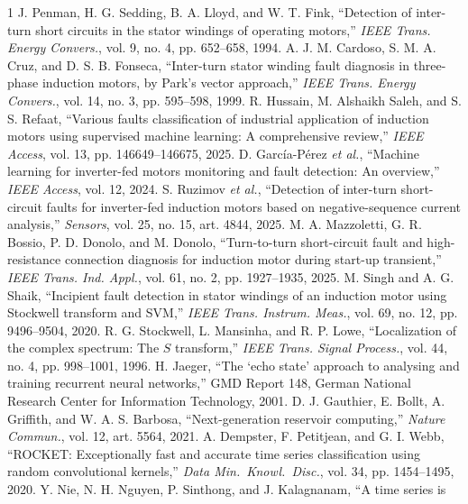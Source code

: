 \documentclass[journal]{IEEEtran}
\begin{document}
\begin{thebibliography}{1}
 J. Penman, H. G. Sedding, B. A. Lloyd, and W. T. Fink, ``Detection of
inter-turn short circuits in the stator windings of operating motors,'' \emph{IEEE Trans. Energy
Convers.}, vol. 9, no. 4, pp. 652--658, 1994.
 A. J. M. Cardoso, S. M. A. Cruz, and D. S. B. Fonseca, ``Inter-turn stator
winding fault diagnosis in three-phase induction motors, by Park's vector approach,'' \emph{IEEE
Trans. Energy Convers.}, vol. 14, no. 3, pp. 595--598, 1999.
 R. Hussain, M. Alshaikh Saleh, and S. S. Refaat, ``Various faults
classification of industrial application of induction motors using supervised machine learning: A
comprehensive review,'' \emph{IEEE Access}, vol. 13, pp. 146649--146675, 2025.
 D. García-Pérez \emph{et al.}, ``Machine learning for inverter-fed motors
monitoring and fault detection: An overview,'' \emph{IEEE Access}, vol. 12, 2024.
 S. Ruzimov \emph{et al.}, ``Detection of inter-turn short-circuit faults for
inverter-fed induction motors based on negative-sequence current analysis,'' \emph{Sensors}, vol.
25, no. 15, art. 4844, 2025.
 M. A. Mazzoletti, G. R. Bossio, P. D. Donolo, and M. Donolo,
``Turn-to-turn short-circuit fault and high-resistance connection diagnosis for induction motor
during start-up transient,'' \emph{IEEE Trans. Ind. Appl.}, vol. 61, no. 2, pp. 1927--1935, 2025.
 M. Singh and A. G. Shaik, ``Incipient fault detection in stator windings of an
induction motor using Stockwell transform and SVM,'' \emph{IEEE Trans. Instrum. Meas.}, vol. 69,
no. 12, pp. 9496--9504, 2020.
 R. G. Stockwell, L. Mansinha, and R. P. Lowe, ``Localization of the complex
spectrum: The $S$ transform,'' \emph{IEEE Trans. Signal Process.}, vol. 44, no. 4, pp. 998--1001, 1996.
 H. Jaeger, ``The `echo state' approach to analysing and training recurrent
neural networks,'' GMD Report 148, German National Research Center for Information Technology, 2001.
 D. J. Gauthier, E. Bollt, A. Griffith, and W. A. S. Barbosa, ``Next-generation
reservoir computing,'' \emph{Nature Commun.}, vol. 12, art. 5564, 2021.
 A. Dempster, F. Petitjean, and G. I. Webb, ``ROCKET: Exceptionally fast and
accurate time series classification using random convolutional kernels,'' \emph{Data Min.\ Knowl.\
Disc.}, vol. 34, pp. 1454--1495, 2020.
 Y. Nie, N. H. Nguyen, P. Sinthong, and J. Kalagnanam, ``A time series is

\end{thebibliography}
\end{document}
